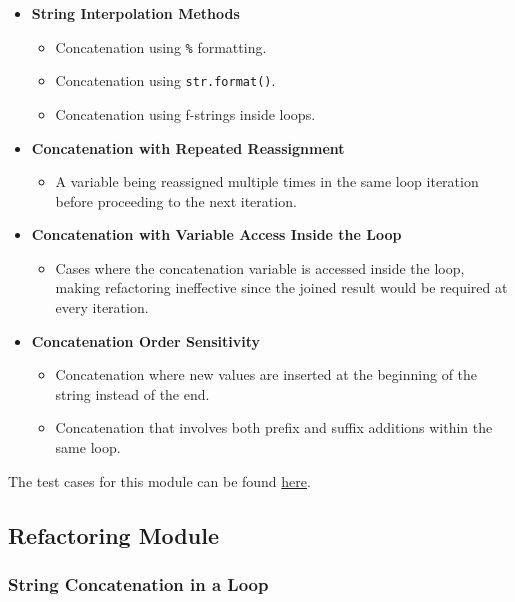 \documentclass[12pt, titlepage]{article}
\begin{document}
\begin{itemize}
  \item \textbf{String Interpolation Methods}
  \begin{itemize}
      \item Concatenation using \texttt{\%} formatting.
      \item Concatenation using \texttt{str.format()}.
      \item Concatenation using f-strings inside loops.
  \end{itemize}

  \item \textbf{Concatenation with Repeated Reassignment}
  \begin{itemize}
      \item A variable being reassigned multiple times in the same loop iteration before proceeding to the next iteration.
  \end{itemize}

  \item \textbf{Concatenation with Variable Access Inside the Loop}
  \begin{itemize}
      \item Cases where the concatenation variable is accessed inside the loop, making refactoring ineffective since the joined result would be required at every iteration.
  \end{itemize}

  \item \textbf{Concatenation Order Sensitivity}
  \begin{itemize}
      \item Concatenation where new values are inserted at the beginning of the string instead of the end.
      \item Concatenation that involves both prefix and suffix additions within the same loop.
  \end{itemize}
\end{itemize}


\noindent The test cases for this module can be found \href{https://github.com/ssm-lab/capstone--source-code-optimizer/blob/new-poc/tests/analyzers/test_str_concat_in_loop.py}{here}.

\subsection{Refactoring Module}

\subsubsection{String Concatenation in a Loop}
\end{document}
